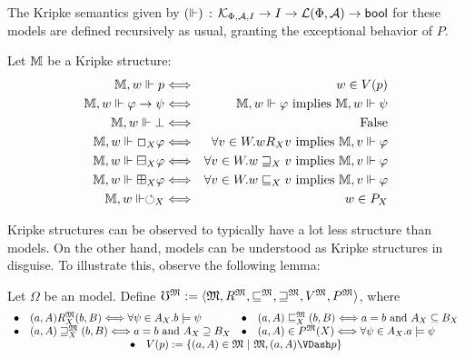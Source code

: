 The Kripke semantics given by $(\Vdash) \colons \mathcal{K}_{\Phi, \mathcal{A}, I} \to I
\rightarrow \mathcal{L}(\Phi, \mathcal{A}) \to \text{\tmtextsf{bool}}$ for these models are defined recursively
as usual, granting the exceptional behavior of $P$.
\begin{definition}
  Let $\mathbbm{M}$ be a Kripke structure:
  \begin{eqnarray*}
    \mathbbm{M}, w \Vdash p & \Longleftrightarrow & w \in V
    (p)\\
    \mathbbm{M}, w \Vdash \phi \rightarrow \psi & \Longleftrightarrow &
    \mathbbm{M}, w \Vdash \phi \text{ implies } \mathbbm{M}, w \Vdash \psi\\
    \mathbbm{M}, w \Vdash \bot & \Longleftrightarrow & \text{False}\\
    \mathbbm{M}, w \Vdash \Box_X \phi & \Longleftrightarrow & \forall v \in
    W . w R_X v \text{ implies } \mathbbm{M}, v
    \Vdash \phi\\
    \mathbbm{M}, w \Vdash \boxminus_X \phi & \Longleftrightarrow & \forall v
    \in W . w \sqsupseteq_X v \text{ implies }
    \mathbbm{M}, v \Vdash \phi\\
    \mathbbm{M}, w \Vdash \boxplus_X \phi & \Longleftrightarrow & \forall v
    \in W . w \sqsubseteq_X v \text{ implies }
    \mathbbm{M}, v \Vdash \phi\\
    \mathbbm{M}, w \Vdash \circlearrowleft_X & \Longleftrightarrow & w \in
    P_X
  \end{eqnarray*}
\end{definition}
Kripke structures can be observed to typically have a lot less structure than
 models.  On the other hand,   models
can be understood as Kripke structures in disguise.  To illustrate
this, observe the following lemma:
\begin{definition}\label{omega-translation}
Let $\Omega$ be an  model.  Define
  $\mho^{\Omega} \assign \langle \Omega, R^{\Omega},
  \sqsubseteq^{\Omega}, \sqsupseteq^{\Omega}, V^{\Omega},
  P^{\Omega} \rangle$, where
  \[ \begin{array}{llll}
       \bullet & \text{$(a, A) R^{\Omega}_X (b, B) \Longleftrightarrow \forall
       \psi \in A_X .b \models \psi$} & \bullet & (a, A)
       \sqsubseteq^{\Omega}_X (b, B) \Longleftrightarrow a = b \text{ and }
       A_X \subseteq B_X\\
       \bullet & (a, A) \sqsupseteq^{\Omega}_X (b, B) \Longleftrightarrow a =
       b \text{ and } A_X \supseteq B_X & \bullet & (a, A) \in
       P^{\Omega} (X) \Longleftrightarrow \forall \psi \in
       A_X .a \models \psi \\
\multicolumn{4}{c}{\bullet\ \ \ V(p) := \{ (a,A) \in \mathfrak{M} \ |\ \mathfrak{M},(a,A)\VDash p\}}
     \end{array} \]
\end{definition}

